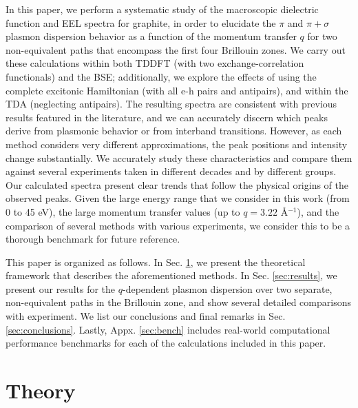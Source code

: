 \documentclass[aps,prb,10pt,showpacs,superscriptaddress,twocolumn,notitlepage]{revtex4-1}
\begin{document}
In this paper, we perform a systematic study of the macroscopic dielectric
function and EEL spectra for graphite, in order to elucidate the $\pi$ and $\pi
+ \sigma$ plasmon dispersion behavior as a function of the momentum transfer $q$
for two non-equivalent paths that encompass the first four Brillouin zones. We
carry out these calculations within both TDDFT (with two exchange-correlation
functionals) and the BSE; additionally, we explore the effects of using the
complete excitonic Hamiltonian (with all e-h pairs and antipairs), and within
the TDA (neglecting antipairs). The resulting spectra are consistent with
previous results featured in the literature, and we can accurately discern which
peaks derive from plasmonic behavior or from interband transitions. However, as
each method considers very different approximations, the peak positions and
intensity change substantially. We accurately study these characteristics and
compare them against several experiments taken in different decades and by
different groups. Our calculated spectra present clear trends that follow the
physical origins of the observed peaks. Given the large energy range that we
consider in this work (from 0 to 45 eV), the large momentum transfer values (up
to $q = 3.22$ \r{A}$^{-1}$), and the comparison of several methods with various
experiments, we consider this to be a thorough benchmark for future reference.

This paper is organized as follows. In Sec. \ref{sec:theory}, we present the
theoretical framework that describes the aforementioned methods. In Sec.
\ref{sec:results}, we present our results for the $q$-dependent plasmon
dispersion over two separate, non-equivalent paths in the Brillouin zone, and
show several detailed comparisons with experiment. We list our conclusions and
final remarks in Sec. \ref{sec:conclusions}. Lastly, Appx. \ref{sec:bench}
includes real-world computational performance benchmarks for each of the
calculations included in this paper.


\section{Theory}\label{sec:theory}
\end{document}
